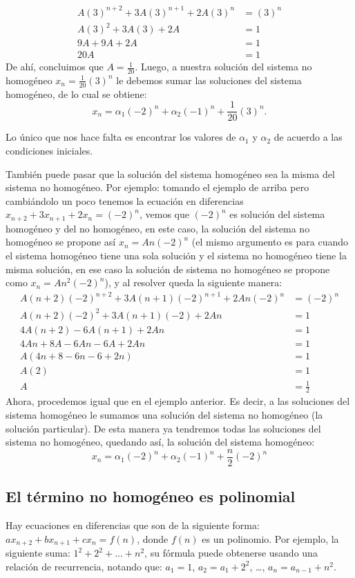 \documentclass{report}
\begin{document}
\begin{align*}
  A(3)^{n+2}+3A(3)^{n+1}+2A(3)^n&=(3)^n\\
  A(3)^2+3A(3)+2A&=1\\
  9A+9A+2A&=1\\
  20A&=1
\end{align*}
De ahí, concluimos que $A=\frac{1}{20}$.
Luego, a nuestra solución del sistema no homogéneo  $x_n=\frac{1}{20}(3)^n$ le debemos sumar las soluciones del sistema homogéneo, de lo cual se obtiene:
$$x_n=\alpha_1(-2)^n+\alpha_2(-1)^n+\frac{1}{20}(3)^n.$$

Lo único que nos hace falta es encontrar los valores de $\alpha_1$ y $\alpha_2$ de acuerdo a las condiciones iniciales.

También puede pasar que la solución del sistema homogéneo sea la misma del sistema no homogéneo. Por ejemplo: tomando el ejemplo de arriba pero cambiándolo un poco tenemos la ecuación en diferencias $x_{n+2}+3x_{n+1}+2x_n=(-2)^n$, vemos que $(-2)^n$ es solución del sistema homogéneo y del no homogéneo, en este caso, la solución del sistema no homogéneo se propone así $x_n=An(-2)^n$ (el mismo argumento es para cuando el sistema homogéneo tiene una sola solución y el sistema no homogéneo tiene la misma solución, en ese caso la solución de sistema no homogéneo se propone como $x_n=An^2(-2)^n$), y al resolver queda la siguiente manera:
\begin{align*}
  A(n+2)(-2)^{n+2}+3A(n+1)(-2)^{n+1}+2An(-2)^n&=(-2)^n\\
  A(n+2)(-2)^2+3A(n+1)(-2)+2An&=1\\
  4A(n+2)-6A(n+1)+2An&=1\\
  4An+8A-6An-6A+2An&=1\\
  A(4n+8-6n-6+2n)&=1\\
  A(2)&=1\\
  A&=\frac{1}{2}
\end{align*}
Ahora, procedemos igual que en el ejemplo anterior. Es decir, a las soluciones del sistema homogéneo le sumamos una solución del sistema no homogéneo (la solución particular). De esta manera ya tendremos todas las soluciones del sistema no homogéneo, quedando así, la solución del sistema homogéneo:
$$x_n=\alpha_1(-2)^n+\alpha_2(-1)^n+\frac{n}{2}(-2)^n$$
\subsection{El término no homogéneo es polinomial}
\label{sec:polinomial}

Hay ecuaciones en diferencias que son de la siguiente forma: $ax_{n+2}+bx_{n+1}+cx_n=f(n)$, donde $f(n)$ es un polinomio. Por ejemplo, la siguiente suma: $1^2+2^2+...+n^2$, su fórmula puede obtenerse usando una relación de recurrencia, notando que:
$a_1=1$, $a_2=a_1+2^2$, \dots, $a_n=a_{n-1}+n^2$.
\end{document}
